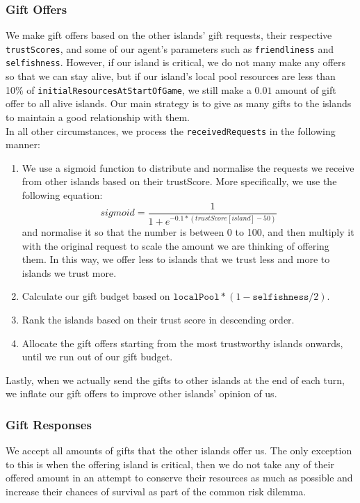 \subsubsection{Gift Offers}
We make gift offers based on the other islands' gift requests, their respective \texttt{trustScores}, and some of our agent's parameters such as \texttt{friendliness} and \texttt{selfishness}. However, if our island is critical, we do not many make any offers so that we can stay alive, but if our island's local pool resources are less than 10\% of \texttt{initialResourcesAtStartOfGame}, we still make a $0.01$ amount of gift offer to all alive islands. Our main strategy is to give as many gifts to the islands to maintain a good relationship with them.\\

In all other circumstances, we process the \texttt{receivedRequests} in the following manner:

\begin{enumerate}
    \item We use a sigmoid function to distribute and normalise the requests we receive from other islands based on their trustScore. More specifically, we use the following equation:
    \begin{equation}
    sigmoid = \frac{1}{1+e^{-0.1*(trustScore[island]-50)}}
    \end{equation}
    and normalise it so that the number is between 0 to 100, and then multiply it with the original request to scale the amount we are thinking of offering them. In this way, we offer less to islands that we trust less and more to islands we trust more.
    \item Calculate our gift budget based on \(\texttt{localPool}*(1-\texttt{selfishness}/2)\).
    \item Rank the islands based on their trust score in descending order.
    \item Allocate the gift offers starting from the most trustworthy islands onwards, until we run out of our gift budget.
\end{enumerate}

Lastly, when we actually send the gifts to other islands at the end of each turn, we inflate our gift offers to improve other islands' opinion of us.

\subsubsection{Gift Responses}
We accept all amounts of gifts that the other islands offer us. The only exception to this is when the offering island is critical, then we do not take any of their offered amount in an attempt to conserve their resources as much as possible and increase their chances of survival as part of the common risk dilemma.

